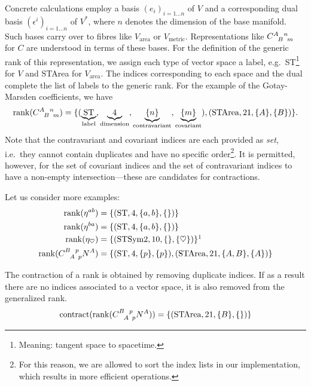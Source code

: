 Concrete calculations employ a basis $(e_i)_{i=1\dots n}$ of $V$ and a corresponding dual basis $(\epsilon^i)_{i=1\dots n}$ of $V^\ast$, where $n$ denotes the dimension of the base manifold. Such bases carry over to fibres like $V_\text{area}$ or $V_\text{metric}$. Representations like $\gmc{A}{B}{n}{m}$ for $C$ are understood in terms of these bases. For the definition of the generic rank of this representation, we assign each type of vector space a label, e.g.\ ST\footnote{Meaning: tangent space to spacetime.} for $V$ and STArea for $V_\text{area}$. The indices corresponding to each space and the dual complete the list of labels to the generic rank. For the example of the Gotay-Marsden coefficients, we have
\begin{equation}
  \operatorname{rank}(\gmc{A}{B}{n}{m}) = \{(\underbrace{\text{ST}}_{\text{label}}, \underbrace{4}_{\text{dimension}}, \underbrace{\{n\}}_{\text{contravariant}}, \underbrace{\{m\}}_{\text{covariant}}), (\text{STArea}, 21, \{A\}, \{B\})\}.
\end{equation}
Note that the contravariant and covariant indices are each provided as \emph{set}, i.e.\ they cannot contain duplicates and have no specific order\footnote{For this reason, we are allowed to sort the index lists in our implementation, which results in more efficient operations.}. It is permitted, however, for the set of covariant indices and the set of contravariant indices to have a non-empty intersection---these are candidates for contractions.

Let us consider more examples:
\begin{align}
  \operatorname{rank}(\eta^{ab}) = {} & \{(\text{ST}, 4, \{a,b\}, \{\})\} \\
  \operatorname{rank}(\eta^{ba}) = {} & \{(\text{ST}, 4, \{a,b\}, \{\})\} \\
  \operatorname{rank}(\eta_{\heartsuit}) = {} & \{(\text{STSym2}, 10, \{\}, \{\heartsuit\})\}\footnotemark \\
  \operatorname{rank}(\gmc{B}{A}{p}{p} N^A) = {} & \{(\text{ST}, 4, \{p\}, \{p\}), (\text{STArea}, 21, \{A,B\}, \{A\})\}
\end{align}

The contraction of a rank is obtained by removing duplicate indices. If as a result there are no indices associated to a vector space, it is also removed from the generalized rank.
\begin{equation}
  \operatorname{contract}(\operatorname{rank}(\gmc{B}{A}{p}{p} N^A)) = \{(\text{STArea}, 21, \{B\}, \{\})\}
\end{equation}

